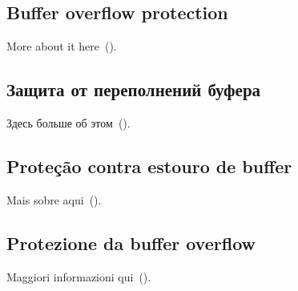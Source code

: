 \ifdefined\ENGLISH
\subsection{Buffer overflow protection}

More about it here~().
\fi

\ifdefined\RUSSIAN
\subsection{Защита от переполнений буфера}

Здесь больше об этом~().
\fi

\ifdefined\BRAZILIAN
\subsection{Proteção contra estouro de buffer}

Mais sobre aqui~().
\fi

\ifdefined\ITALIAN
\subsection{Protezione da buffer overflow}

Maggiori informazioni qui~().
\fi
